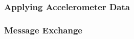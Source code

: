 \subsubsection{Applying Accelerometer Data}
\label{sec:accelerometer-using-data-test}
%
\subsubsection{Message Exchange}
\label{sec:bt-connection-test}
%